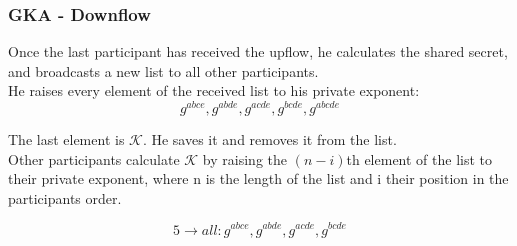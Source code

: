 \begin{frame}
  \frametitle{GKA - Downflow}
  Once the last participant has received the upflow, he calculates the shared secret, and broadcasts a new list to all other participants.\\[0.3cm]

  He raises every element of the  received list to his private exponent:
  \[ g^{abce}, g^{abde}, g^{acde}, g^{bcde}, g^{abcde} \]

  The last element is $\mathcal{K}$. He saves it and removes it from the list.\\[0.3cm]

  Other participants calculate $\mathcal{K}$ by raising the $(n-i)$th element of the list to their private exponent, where n is the length of the list and i their position in the participants order.

  \begin{minipage}{.47\textwidth}
    \[ 5 \rightarrow all: g^{abce}, g^{abde}, g^{acde}, g^{bcde} \]

  \end{minipage}
  \begin{minipage}{.47\textwidth}
  \begin{figure}
    \end{figure}
  \end{minipage}
\end{frame}
